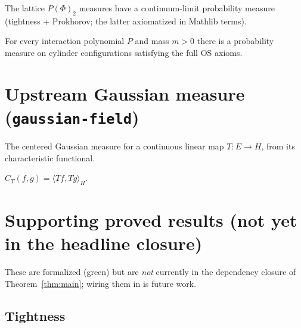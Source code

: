 \begin{theorem}\label{thm:limit-os}
  \leanok
\end{theorem}

\begin{theorem}\label{thm:limit-exists}
  \leanok
  The lattice $P(\Phi)_2$ measures have a continuum-limit probability measure
  (tightness + Prokhorov; the latter axiomatized in Mathlib terms).
\end{theorem}

\begin{theorem}\label{thm:main}
  \leanok{}
  For every interaction polynomial $P$ and mass $m>0$ there is a probability
  measure on cylinder configurations satisfying the full OS axioms.
\end{theorem}

\chapter{Upstream Gaussian measure (\texttt{gaussian-field})}

\begin{definition}\label{def:gff-measure}
  \leanok
  The centered Gaussian measure for a continuous linear map $T : E \to H$, from
  its characteristic functional.
\end{definition}
\begin{definition}\label{def:gff-covariance}
  \leanok
  $C_T(f,g) = \langle Tf, Tg\rangle_H$.
\end{definition}

\chapter{Supporting proved results (not yet in the headline closure)}\label{chap:supporting}

These are formalized (green) but are \emph{not} currently in the dependency
closure of Theorem~\ref{thm:main}; wiring them in is future work.

\section{Tightness}
\begin{theorem}\label{thm:tight-upstream}
  \leanok
\end{theorem}
\begin{theorem}\label{thm:tight}
  \leanok
\end{theorem}

